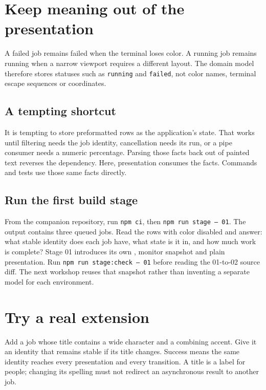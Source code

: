 \section{Keep meaning out of the presentation}

A failed job remains failed when the terminal loses color. A running job remains running when a narrow viewport requires a different layout. The domain model therefore stores statuses such as \texttt{running} and \texttt{failed}, not color names, terminal escape sequences or coordinates.

\subsection{A tempting shortcut}

It is tempting to store preformatted rows as the application's state. That works until filtering needs the job identity, cancellation needs its run, or a pipe consumer needs a numeric percentage. Parsing those facts back out of painted text reverses the dependency. Here, presentation consumes the facts. Commands and tests use those same facts directly.

\subsection{Run the first build stage}

From the companion repository, run \texttt{npm ci}, then \texttt{npm run stage -- 01}. The output contains three queued jobs. Read the rows with color disabled and answer: what stable identity does each job have, what state is it in, and how much work is complete? Stage 01 introduces its own , monitor snapshot and plain presentation. Run \texttt{npm run stage:check -- 01} before reading the 01-to-02 source diff. The next workshop reuses that snapshot rather than inventing a separate model for each environment.

\section{Try a real extension}

Add a job whose title contains a wide character and a combining accent. Give it an identity that remains stable if its title changes. Success means the same identity reaches every presentation and every transition. A title is a label for people; changing its spelling must not redirect an asynchronous result to another job.
